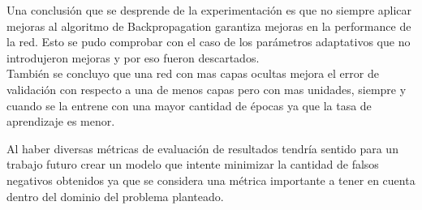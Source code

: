 Una conclusión que se desprende de la experimentación es que no siempre aplicar mejoras al algoritmo de Backpropagation garantiza mejoras en la performance de la red. Esto
se pudo comprobar con el caso de los parámetros adaptativos que no introdujeron mejoras y por eso fueron descartados. \\
También se concluyo que una red con mas capas ocultas mejora el error de validación con respecto a una de menos capas pero con mas unidades, siempre y cuando se la entrene
con una mayor cantidad de épocas ya que la tasa de aprendizaje es menor.

Al haber diversas métricas de evaluación de resultados tendría sentido para un trabajo futuro crear un modelo que intente minimizar la cantidad de falsos negativos obtenidos
 ya que se considera una métrica importante a tener en cuenta dentro del dominio del problema planteado.

\newpage
